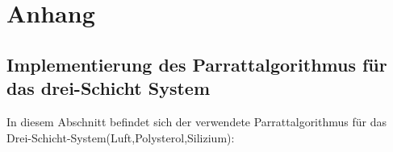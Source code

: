 \chapter*{Anhang}
\label{cha:Messdaten}


\section{Implementierung des Parrattalgorithmus für das drei-Schicht System}
\label{anh:parratt}
In diesem Abschnitt befindet sich der verwendete Parrattalgorithmus für das Drei-Schicht-System(Luft,Polysterol,Silizium):

